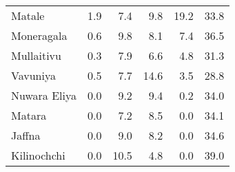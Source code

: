 \begin{tabular}{lrrrrr}
Matale       &         1.9 &         7.4 &          9.8 &             19.2 &        33.8 \\
Moneragala   &         0.6 &         9.8 &          8.1 &              7.4 &        36.5 \\
Mullaitivu   &         0.3 &         7.9 &          6.6 &              4.8 &        31.3 \\
Vavuniya     &         0.5 &         7.7 &         14.6 &              3.5 &        28.8 \\
Nuwara Eliya &         0.0 &         9.2 &          9.4 &              0.2 &        34.0 \\
Matara       &         0.0 &         7.2 &          8.5 &              0.0 &        34.1 \\
Jaffna       &         0.0 &         9.0 &          8.2 &              0.0 &        34.6 \\
Kilinochchi  &         0.0 &        10.5 &          4.8 &              0.0 &        39.0 \\
\bottomrule
\end{tabular}
